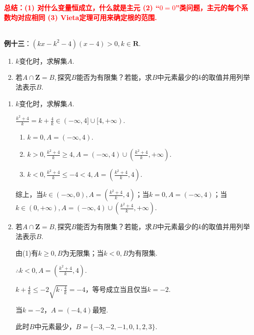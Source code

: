 \documentclass[8pt]{article}
\begin{document}
					\textcolor{red}{\textbf{总结：(1) 对什么变量恒成立，什么就是主元 (2) “$0=0$”类问题，主元的每个系数均对应相同 (3) Vieta定理可用来确定根的范围.}}

				~\\

				\textbf{例十三}：$(kx-k^2-4)(x-4)>0, k\in\mathbf{R}.$
					\begin{enumerate}[label=(\arabic*)]
						\item $k$变化时，求解集$A$.
						\item 若$A\cap\mathbf{Z}=B,$探究$B$能否为有限集？若能，求$B$中元素最少的$k$的取值并用列举法表示$B$.
					\end{enumerate}

					\begin{enumerate}[label=(\arabic*)]
						\item $k$变化时，求解集$A$.

							$\displaystyle \frac{k^2+4}{k}=k+\frac{4}{k}\in(-\infty, 4]\cup[4, +\infty).$

							\begin{enumerate}[label=$\arabic*^{\circ}$]
								\item $k=0, A=(-\infty, 4)$.
								\item $k>0, \displaystyle\frac{k^2+4}{k}\geq 4, A=(-\infty, 4)\cup\left(\frac{k^2+4}{k}, +\infty\right).$
								\item $k<0, \displaystyle\frac{k^2+4}{k}\leq -4 < 4, A=\left(\frac{k^2+4}{k}, 4\right).$
							\end{enumerate}

							综上，当$\displaystyle k\in(-\infty, 0), A=\left(\frac{k^2+4}{k}, 4\right)$；当$\displaystyle k=0, A=(-\infty, 4)$；当$\displaystyle k\in(0, +\infty), A=(-\infty, 4)\cup\left(\frac{k^2+4}{k}, +\infty\right).$

						\item 若$A\cap\mathbf{Z}=B,$探究$B$能否为有限集？若能，求$B$中元素最少的$k$的取值并用列举法表示$B$.

							由(1)有$k\geq 0, B$为无限集；当$k<0, B$为有限集.

							$\displaystyle \therefore k<0, A=\left(\frac{k^2+4}{k}, 4\right).$

							$\displaystyle k+\frac{4}{k}\leq-2\sqrt{k\cdot\frac{4}{k}}=-4$，等号成立当且仅当$k=-2$.

							当$k=-2$，$A=(-4, 4)$最短.

							此时$B$中元素最少，$B=\{-3, -2, -1, 0, 1, 2, 3\}.$

					\end{enumerate}
\end{document}
